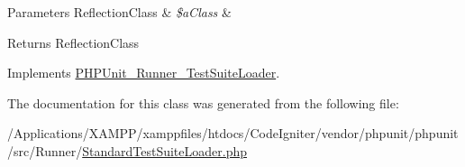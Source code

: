 \begin{DoxyParams}[1]{Parameters}
Reflection\+Class & {\em \$a\+Class} & \\
\hline
\end{DoxyParams}
\begin{DoxyReturn}{Returns}
Reflection\+Class 
\end{DoxyReturn}


Implements \mbox{\hyperlink{interface_p_h_p_unit___runner___test_suite_loader_af50f6853c6ef14bbd0162b490c45eb66}{P\+H\+P\+Unit\+\_\+\+Runner\+\_\+\+Test\+Suite\+Loader}}.



The documentation for this class was generated from the following file\+:\begin{DoxyCompactItemize}
\item 
/\+Applications/\+X\+A\+M\+P\+P/xamppfiles/htdocs/\+Code\+Igniter/vendor/phpunit/phpunit/src/\+Runner/\mbox{\hyperlink{_standard_test_suite_loader_8php}{Standard\+Test\+Suite\+Loader.\+php}}\end{DoxyCompactItemize}
